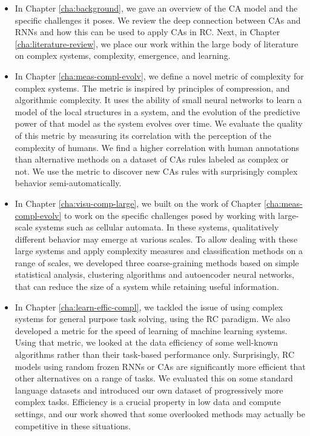 \begin{itemize}
  \item In Chapter \ref{cha:background}, we gave an overview of the \acf{CA}
        model and the specific challenges it poses. We review the deep
        connection between \acp{CA} and \acfp{RNN} and how this can be used to apply
        \acp{CA} in \acf{RC}. Next, in Chapter \ref{cha:literature-review}, we
        place our work within the large body of literature on complex systems,
        complexity, emergence, and learning.

  \item In Chapter \ref{cha:meas-compl-evolv}, we define a novel metric of
        complexity for complex systems. The metric is inspired by principles of
        compression, and algorithmic complexity. It uses the ability of small
        neural networks to learn a model of the local structures in a system,
        and the evolution of the predictive power of that model as the system
        evolves over time. We evaluate the quality of this metric by measuring
        its correlation with the perception of the complexity of humans. We find a
        higher correlation with human annotations than alternative methods on a
        dataset of \acp{CA} rules labeled as complex or not. We use the metric
        to discover new \acp{CA} rules with surprisingly complex behavior
        semi-automatically.

  \item In Chapter \ref{cha:visu-comp-large}, we built on the work of Chapter
        \ref{cha:meas-compl-evolv} to work on the specific challenges posed by
        working with large-scale systems such as cellular automata. In these
        systems, qualitatively different behavior may emerge at various scales.
        To allow dealing with these large systems and apply complexity measures
        and classification methods on a range of scales, we developed three
        coarse-graining methods based on simple statistical analysis, clustering
        algorithms and autoencoder neural networks, that can reduce the size of
        a system while retaining useful information.

  \item In Chapter \ref{cha:learn-effic-compl}, we tackled the issue of using
        complex systems for general purpose task solving, using the \ac{RC}
        paradigm. We also developed a metric for the speed of learning of
        machine learning systems. Using that metric, we looked at the data
        efficiency of some well-known algorithms rather than their task-based
        performance only. Surprisingly, \ac{RC} models using random frozen
        \acp{RNN} or \acp{CA} are significantly more efficient that other
        alternatives on a range of tasks. We evaluated this on some standard
        language datasets and introduced our own dataset of progressively more
        complex tasks. Efficiency is a crucial property in low data and compute
        settings, and our work showed that some overlooked methods may actually
        be competitive in these situations.
\end{itemize}
